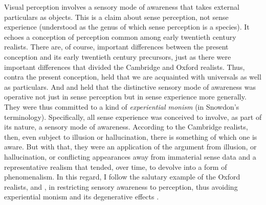 \documentclass[12pt]{article}
\begin{document}
Visual perception involves a sensory mode of awareness that takes external particulars as objects. This is a claim about sense perception, not sense experience (understood as the genus of which sense perception is a species). It echoes a conception of perception common among early twentieth century realists. There are, of course, important differences between the present conception and its early twentieth century precursors, just as there were important differences that divided the Cambridge and Oxford realists. Thus, contra the present conception, \citet[]{Russell:1912uq} held that we are acquainted with universals as well as particulars. And \citet[]{Russell:1912uq} and \citet[]{Price:1932fk} held that the distinctive sensory mode of awareness was operative not just in sense perception but in sense experience more generally. They were thus committed to a kind of \emph{experiential monism} (in Snowdon's \citeyear{Snowdon:2008oz} terminology). Specifically, all sense experience was conceived to involve, as part of its nature, a sensory mode of awareness. According to the Cambridge realists, then, even subject to illusion or hallucination, there is something of which one is aware. But with that, they were an application of the argument from illusion, or hallucination, or conflicting appearances away from immaterial sense data and a representative realism that tended, over time, to devolve into a form of phenomenalism. In this regard, I follow the salutary example of the Oxford realists, \citet{Cook-Wilson:1926sf} and \citet[]{Prichard:1906gf,Prichard:1909yg}, in restricting sensory awareness to perception, thus avoiding experiential monism and its degenerative effects \citep[see][]{Marion:2000kl,Marion:2000ai,Kalderon:2010fk}.
\end{document}
